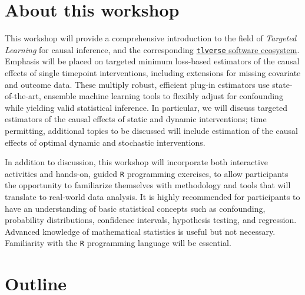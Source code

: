 \documentclass[
  12pt, krantz2,
]{book}
\newcommand{\passthrough}[1]{#1}
\theoremstyle{definition}
\theoremstyle{definition}
\theoremstyle{definition}
\newcommand{\1}{\mathbbm{1}}
\begin{document}
\hypertarget{about-this-workshop}{%
\section*{About this workshop}\label{about-this-workshop}}


This workshop will provide a comprehensive introduction to the field of
\emph{Targeted Learning} for causal inference, and the corresponding \href{https://github.com/tlverse}{\passthrough{\lstinline!tlverse!} software
ecosystem}. Emphasis will be placed on targeted
minimum loss-based estimators of the causal effects of single timepoint
interventions, including extensions for missing covariate and outcome data.
These multiply robust, efficient plug-in estimators use state-of-the-art,
ensemble machine learning tools to flexibly adjust for confounding while
yielding valid statistical inference. In particular, we will discuss targeted
estimators of the causal effects of static and dynamic interventions; time
permitting, additional topics to be discussed will include estimation of the
causal effects of optimal dynamic and stochastic interventions.

In addition to discussion, this workshop will incorporate both interactive
activities and hands-on, guided \passthrough{\lstinline!R!} programming exercises, to allow participants
the opportunity to familiarize themselves with methodology and tools that will
translate to real-world data analysis. It is highly recommended for participants
to have an understanding of basic statistical concepts such as confounding,
probability distributions, confidence intervals, hypothesis testing, and
regression. Advanced knowledge of mathematical statistics is useful but not
necessary. Familiarity with the \passthrough{\lstinline!R!} programming language will be essential.

\hypertarget{outline}{%
\section*{Outline}\label{outline}}
\end{document}
